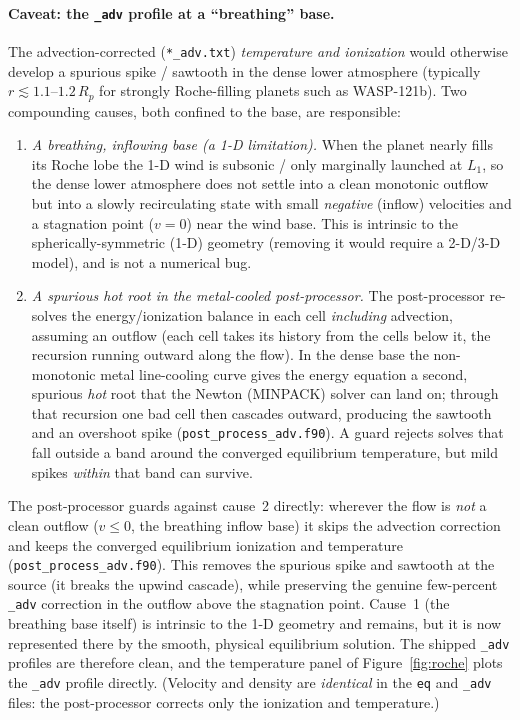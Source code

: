 \documentclass[english,a4paper]{my_memo}
\begin{document}
\paragraph{Caveat: the \texttt{\_adv} profile at a ``breathing'' base.}
The advection-corrected (\texttt{*\_adv.txt}) \emph{temperature and ionization}
would otherwise develop a spurious spike / sawtooth in the dense lower atmosphere
(typically $r\lesssim1.1$--$1.2\,R_p$ for strongly Roche-filling planets such as
WASP-121b). Two compounding causes, both confined to the base, are responsible:
\begin{enumerate}\itemsep2pt
\item \emph{A breathing, inflowing base (a 1-D limitation).} When the planet
  nearly fills its Roche lobe the 1-D wind is subsonic / only marginally launched
  at $L_1$, so the dense lower atmosphere does not settle into a clean monotonic
  outflow but into a slowly recirculating state with small \emph{negative}
  (inflow) velocities and a stagnation point ($v=0$) near the wind base. This is
  intrinsic to the spherically-symmetric (1-D) geometry (removing it would
  require a 2-D/3-D model), and is not a numerical bug.
\item \emph{A spurious hot root in the metal-cooled post-processor.} The
  post-processor re-solves the energy/ionization balance in each cell \emph{including}
  advection, assuming an outflow (each cell takes its history from the cells
  below it, the recursion running outward along the flow). In the dense base the non-monotonic metal line-cooling curve
  gives the energy equation a second, spurious \emph{hot} root that the Newton
  (MINPACK) solver can land on; through that recursion one bad cell then
  cascades outward, producing the sawtooth and an overshoot spike
  (\texttt{post\_process\_adv.f90}). A guard rejects solves that fall outside a
  band around the converged equilibrium temperature, but mild spikes \emph{within}
  that band can survive.
\end{enumerate}
The post-processor guards against cause~2 directly: wherever the flow is
\emph{not} a clean outflow ($v\le0$, the breathing inflow base) it skips the
advection correction and keeps the converged equilibrium ionization and
temperature (\texttt{post\_process\_adv.f90}). This removes the spurious spike and
sawtooth at the source (it breaks the upwind cascade), while preserving the
genuine few-percent \texttt{\_adv} correction in the outflow above the stagnation
point. Cause~1 (the breathing base itself) is intrinsic to the 1-D geometry and
remains, but it is now represented there by the smooth, physical equilibrium
solution. The shipped \texttt{\_adv} profiles are therefore clean, and the
temperature panel of Figure~\ref{fig:roche} plots the \texttt{\_adv} profile
directly. (Velocity and density are \emph{identical} in the \texttt{eq} and
\texttt{\_adv} files: the post-processor corrects only the ionization and
temperature.)
\end{document}
